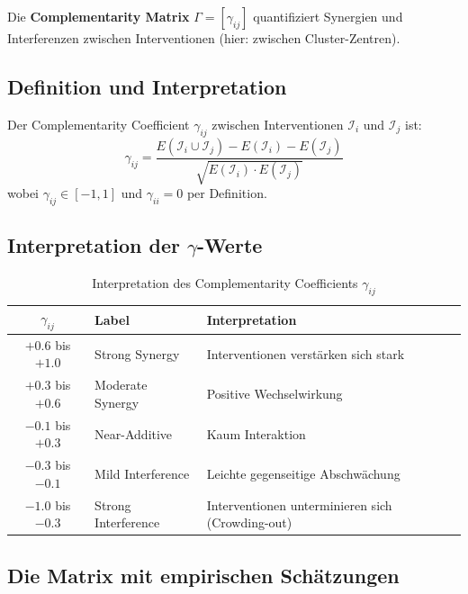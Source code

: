 Die \textbf{Complementarity Matrix} $\Gamma = [\gamma_{ij}]$ quantifiziert Synergien und Interferenzen zwischen Interventionen (hier: zwischen Cluster-Zentren).

\subsection{Definition und Interpretation}

\begin{definition}
\label{def:20-gamma}
Der Complementarity Coefficient $\gamma_{ij}$ zwischen Interventionen $\mathcal{I}_i$ und $\mathcal{I}_j$ ist:
\begin{equation}
\gamma_{ij} = \frac{E(\mathcal{I}_i \cup \mathcal{I}_j) - E(\mathcal{I}_i) - E(\mathcal{I}_j)}{\sqrt{E(\mathcal{I}_i) \cdot E(\mathcal{I}_j)}}
\label{eq:20-gamma-definition}
\end{equation}
wobei $\gamma_{ij} \in [-1, 1]$ und $\gamma_{ii} = 0$ per Definition.
\end{definition}

\subsection{Interpretation der $\gamma$-Werte}

\begin{table}[htbp]
\centering
\caption{Interpretation des Complementarity Coefficients $\gamma_{ij}$}
\label{tab:20-gamma-interpretation}
\renewcommand{\arraystretch}{1.4}
\begin{tabular}{@{}clp{7cm}@{}}
\toprule
\textbf{$\gamma_{ij}$} & \textbf{Label} & \textbf{Interpretation} \\
\midrule
$+0.6$ bis $+1.0$ & Strong Synergy & Interventionen verstärken sich stark \\
$+0.3$ bis $+0.6$ & Moderate Synergy & Positive Wechselwirkung \\
$-0.1$ bis $+0.3$ & Near-Additive & Kaum Interaktion \\
$-0.3$ bis $-0.1$ & Mild Interference & Leichte gegenseitige Abschwächung \\
$-1.0$ bis $-0.3$ & Strong Interference & Interventionen unterminieren sich (Crowding-out) \\
\bottomrule
\end{tabular}
\end{table}

\subsection{Die Matrix mit empirischen Schätzungen}

